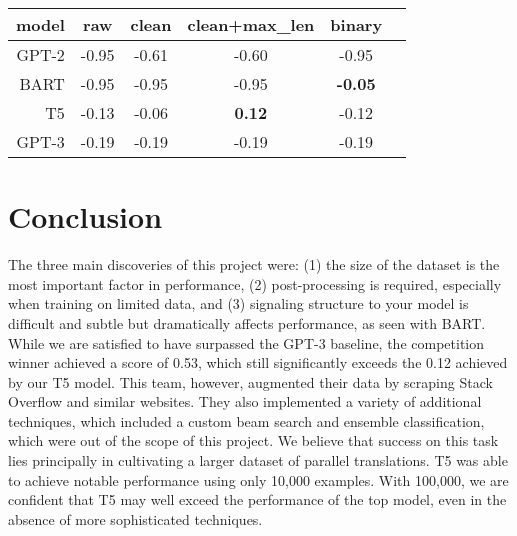 \documentclass{article}
\begin{document}
\begin{center}
	\begin{tabular}{rccccc}
		\toprule
    model & raw   & clean & clean+max\_len & binary\\
		\midrule
    GPT-2 & -0.95 & -0.61 & -0.60 & -0.95          \\
    BART  & -0.95 & -0.95 & -0.95 & \textbf{-0.05}         \\
    T5    & -0.13 & -0.06 & \textbf{0.12} & -0.12   \\
		\hline
    GPT-3  & -0.19 & -0.19 & -0.19 & -0.19         \\
		\bottomrule
	\end{tabular}
\end{center}



\section{Conclusion}
The three main discoveries of this project were: (1) the size of the dataset is
the most important factor in performance, (2) post-processing is required,
especially when training on limited data, and (3) signaling structure to your
model is difficult and subtle but dramatically affects performance, as seen
with BART. While we are satisfied to have surpassed the GPT-3 baseline, the
competition winner achieved a score of 0.53, which still significantly exceeds
the 0.12 achieved by our T5 model. This team, however, augmented their data by
scraping Stack Overflow and similar websites. They also implemented a variety of
additional techniques, which included a custom beam search and ensemble
classification, which were out of the scope of this project. We believe that
success on this task lies principally in cultivating a larger dataset of
parallel translations. T5 was able to achieve notable performance using only
10,000 examples. With 100,000, we are confident that T5 may well exceed the
performance of the top model, even in the absence of more sophisticated
techniques.




\end{document}
